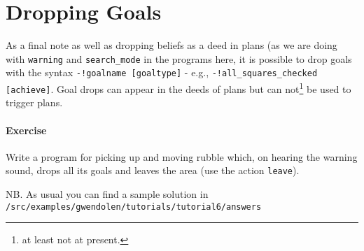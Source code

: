 \section{Dropping Goals}

As a final note as well as dropping beliefs as a deed in plans (as we
are doing with \lstinline{warning} and \lstinline{search_mode} in the
programs here, it is possible to drop goals with the syntax
\lstinline{-!goalname [goaltype]} - e.g.,
\lstinline{-!all_squares_checked [achieve]}.  Goal drops can appear in the deeds of plans but can not\footnote{at least not at present.} be  used to trigger plans. 

\paragraph{Exercise} Write a program for picking up and moving rubble
which, on hearing the warning sound, drops all its goals and leaves
the area (use the action \texttt{leave}). 

\begin{sloppypar}
NB. As usual you can find a sample solution in
\texttt{/src/examples/gwendolen/tutorials/tutorial6/answers} 
\end{sloppypar}

